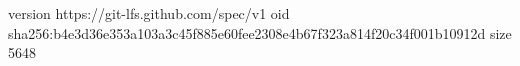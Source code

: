 version https://git-lfs.github.com/spec/v1
oid sha256:b4e3d36e353a103a3c45f885e60fee2308e4b67f323a814f20c34f001b10912d
size 5648
